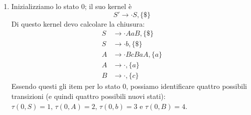 \documentclass[class=book, crop=false, oneside, 12pt]{standalone}
\begin{document}
\begin{enumerate}
    \item Inizializziamo lo stato 0; il suo kernel è 
    \begin{equation*}
        S' \to \cdot S, \{\$\}
    \end{equation*}
    Di questo kernel devo calcolare la chiusura:
    \begin{align*}
        S &\to \cdot AaB, \{\$\} \\
        S &\to \cdot b, \{\$\} \\
        A &\to \cdot BcBaA, \{a\} \\
        A &\to \cdot, \{a\} \\
        B &\to \cdot, \{c\}
    \end{align*}
    Essendo questi gli item per lo stato 0, possiamo identificare quattro possibili transizioni (e quindi quattro possibili nuovi stati): \(\tau(0,S)=1 \textrm{, } \tau(0,A)=2 \textrm{, } \tau(0,b)=3 \textrm{ e } \tau(0,B)=4\).
    

\end{enumerate}
\end{document}
